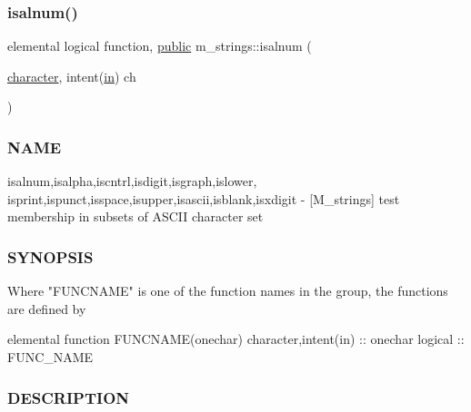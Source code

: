 \subsubsection{\texorpdfstring{isalnum()}{isalnum()}}
{\footnotesize\ttfamily elemental logical function, \hyperlink{M__stopwatch_83_8txt_a2f74811300c361e53b430611a7d1769f}{public} m\+\_\+strings\+::isalnum (\begin{DoxyParamCaption}\item[{\hyperlink{option__stopwatch_83_8txt_abd4b21fbbd175834027b5224bfe97e66}{character}, intent(\hyperlink{M__journal_83_8txt_afce72651d1eed785a2132bee863b2f38}{in})}]{ch }\end{DoxyParamCaption})}



\subsubsection*{N\+A\+ME}

isalnum,isalpha,iscntrl,isdigit,isgraph,islower, isprint,ispunct,isspace,isupper,isascii,isblank,isxdigit -\/ \mbox{[}M\+\_\+strings\mbox{]} test membership in subsets of A\+S\+C\+II character set 

\subsubsection*{S\+Y\+N\+O\+P\+S\+IS}

\begin{DoxyVerb}Where "FUNCNAME" is one of the function names in the group, the functions are defined by

 elemental function FUNCNAME(onechar)
 character,intent(in) :: onechar
 logical              :: FUNC_NAME
\end{DoxyVerb}


\subsubsection*{D\+E\+S\+C\+R\+I\+P\+T\+I\+ON}

